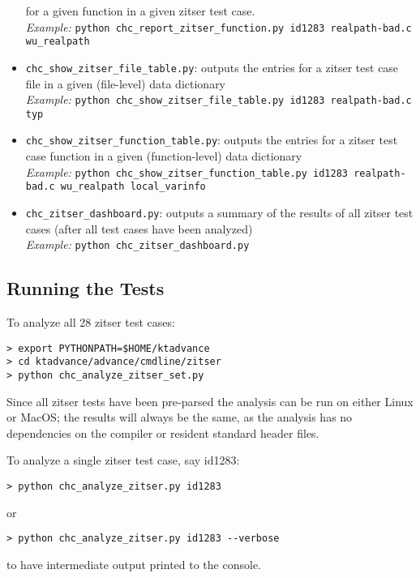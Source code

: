 \documentclass[11pt]{article}
\begin{document}
\begin{itemize}[leftmargin=*]
  for a given function in a given zitser test case.\\
\emph{Example:} {\tt python chc\_report\_zitser\_function.py id1283 realpath-bad.c wu\_realpath}
\item {\tt chc\_show\_zitser\_file\_table.py}: outputs the entries for a zitser test case file
  in a given (file-level) data dictionary \\
\emph{Example:} {\tt python chc\_show\_zitser\_file\_table.py id1283 realpath-bad.c typ}
\item {\tt chc\_show\_zitser\_function\_table.py}: outputs the entries for a zitser test case
  function in a given (function-level) data dictionary \\
\emph{Example:} {\tt python chc\_show\_zitser\_function\_table.py id1283 realpath-bad.c
    wu\_realpath local\_varinfo}
\item {\tt chc\_zitser\_dashboard.py}: outputs a summary of the results of all zitser test
    cases (after all test cases have been analyzed) \\
\emph{Example:} {\tt python chc\_zitser\_dashboard.py} 
\end{itemize}

\subsection{Running the Tests}

To analyze all 28 zitser test cases:
\begin{verbatim}
> export PYTHONPATH=$HOME/ktadvance
> cd ktadvance/advance/cmdline/zitser
> python chc_analyze_zitser_set.py
\end{verbatim}
Since all zitser tests have been pre-parsed the analysis can be run on either Linux
or MacOS; the results will always be the same, as the analysis has no dependencies
on the compiler or resident standard header files.

To analyze a single zitser test case, say id1283:
\begin{verbatim}
> python chc_analyze_zitser.py id1283
\end{verbatim}
or 
\begin{verbatim}
> python chc_analyze_zitser.py id1283 --verbose
\end{verbatim}
to have intermediate output printed to the console.
\end{document}
